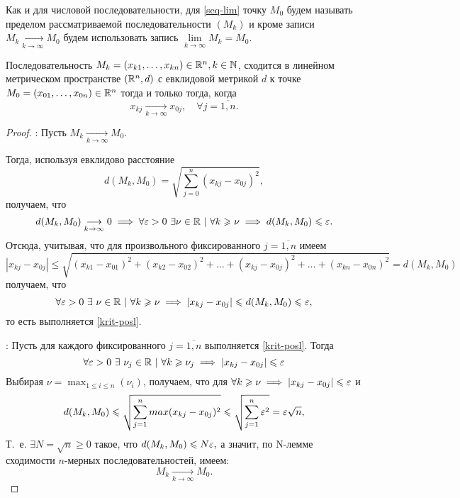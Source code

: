 \documentclass[../../main.tex]{subfiles}
\begin{document}
  Как и для числовой последовательности, для \eqref{seq-lim} точку 
  $M_0$ будем называть пределом рассматриваемой последовательности 
  $(M_k)$ и кроме записи $M_k \underset{k\rightarrow\infty}
  {\longrightarrow}  M_0$ будем использовать запись 
  $ \lim\limits_{k \to \infty}{M_k} = M_0$.
  \begin{thm}
    Последовательность $M_k = (x_{k1}, \dots, x_{kn}) \in \mathbb{R}^n, k 
    \in \mathbb{N}$, сходится в линейном метрическом пространстве $(\mathbb{R}^n, d)$
    с евклидовой метрикой $d$ к точке $M_0 = (x_{01}, \dots, x_{0n})
    \in \mathbb{R}^n$ тогда и только тогда, когда
    \begin{equation}
    \label{krit-posl}
      x_{kj}\underset{k\rightarrow\infty}
      {\longrightarrow} x_{0j}, \quad \forall j = \overline{1, n}.
    \end{equation}
  \end{thm}
  \begin{proof}
    \quad
    
    \nec: 
    Пусть $M_k \underset{k\rightarrow\infty}{\longrightarrow}  M_0$.
    
    Тогда, используя евклидово расстояние 
    \[
      d(M_k, M_0) = \sqrt{\sum_{j = 0}^{n}{(x_{kj} - x_{0j})^2}},
    \]
    получаем, что
    \[
      d(M_k, M_0) \underset{k\rightarrow\infty}{\longrightarrow} 0 
      \implies
      \forall \varepsilon > 0\ \exists \nu \in \mathbb{R}\ |\ \forall k \geqslant \nu 
      \implies d(M_k, M_0) \leqslant \varepsilon.
    \]
    Отсюда, учитывая, что для произвольного фиксированного $j = 
    \overline{1, n}$ имеем
    \[
      |x_{kj} - x_{0j}| \leq \sqrt{(x_{k1} - x_{01})^2 + (x_{k2} - 
      x_{02})^2 + \dots + (x_{kj} - x_{0j})^2 + \dots + (x_{kn} - 
      x_{0n})^2} = d(M_k, M_0) 
    \]
    получаем, что 
    \[
      \forall \varepsilon > 0\ \exists\ \nu \in \mathbb{R}\ |\ \forall k \geqslant \nu 
      \implies |x_{kj} - x_{0j}| \leqslant d(M_k, M_0) \leqslant \varepsilon,
    \]
    то есть выполняется \eqref{krit-posl}.
    
    \bigskip
    
    \suff: Пусть для каждого фиксированного $j = \overline{1, n}$ 
    выполняется \eqref{krit-posl}. Тогда
    \[
      \forall \eps > 0\ \exists\ \nu_j \in \R\ |\ \forall k \ge \nu_j 
      \implies |x_{kj} - x_{0j}| \leq \eps
    \]
    Выбирая $\displaystyle\nu = \max_{1 \le i \le n}(\nu_i)$, 
    получаем, что для $\forall k \geqslant \nu \implies |x_{kj} - x_{0j}| 
    \leqslant \varepsilon$
     и 
     \[
       d(M_k, M_0) \leqslant \sqrt{\sum_{j = 1}^{n}{max(x_{kj} - 
       x_{0j})^2}} \leqslant \sqrt{\sum_{j = 1}^{n}{\varepsilon^2}} = 
       \varepsilon\sqrt{n}, 
     \]
     Т.~е. $\exists N = \sqrt{n} \geq 0$ такое, что $d(M_k, M_0) \leqslant 
     N \varepsilon,$ а значит, по N-лемме сходимости $n$-мерных 
     последовательностей, имеем:
     \[
       M_k \underset{k\rightarrow\infty}{\longrightarrow}  M_0.
     \]
  \end{proof}
\end{document}
